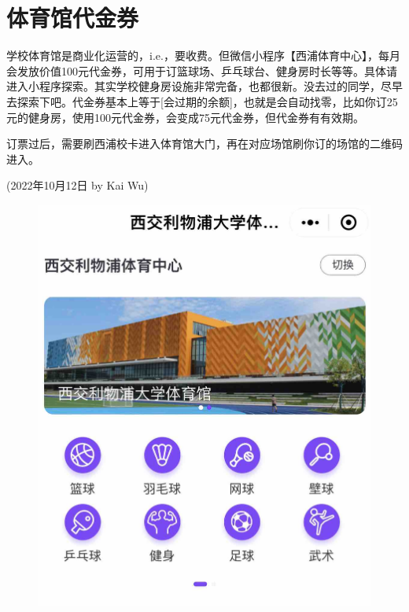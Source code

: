 \section{体育馆代金券}
\begin{newminipage}[0.5]
    学校体育馆是商业化运营的，i.e.，要收费。但微信小程序【西浦体育中心】，每月会发放价值100元代金券，可用于订篮球场、乒乓球台、健身房时长等等。具体请进入小程序探索。其实学校健身房设施非常完备，也都很新。没去过的同学，尽早去探索下吧。代金券基本上等于[会过期的余额]，也就是会自动找零，比如你订25元的健身房，使用100元代金券，会变成75元代金券，但代金券有有效期。

    订票过后，需要刷西浦校卡进入体育馆大门，再在对应场馆刷你订的场馆的二维码进入。

    \begin{flushright}
    (2022年10月12日 by Kai Wu)
    \end{flushright}
\end{newminipage}
\begin{newminipage}[0.45]
    \begin{figure}[H]
        \includegraphics[width=0.95\columnwidth, right]{author-folder/Kai.Wu/sportcenter_miniprogram.jpg}
    \end{figure}
\end{newminipage}


